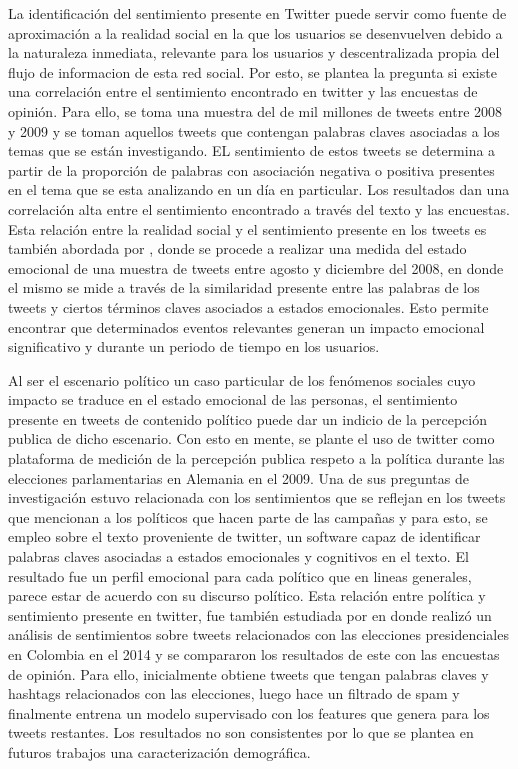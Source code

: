 La identificación del sentimiento presente en Twitter puede servir como fuente de aproximación a la realidad social en la que los usuarios se desenvuelven debido a la naturaleza inmediata, relevante para los usuarios y descentralizada propia del flujo de informacion de esta red social. Por esto,
 \cite{o2010tweets} se plantea la pregunta si existe una correlación entre el sentimiento encontrado en twitter y las encuestas de opinión. Para ello, se toma una muestra del de mil millones de tweets entre 2008 y 2009 y se toman aquellos tweets que contengan palabras claves asociadas a los temas que se están investigando. EL sentimiento de estos tweets se determina a partir de la proporción de palabras con asociación negativa o positiva presentes en el tema que se esta analizando en un día en particular. Los resultados dan una correlación alta entre el sentimiento encontrado a través del texto y las encuestas. Esta relación entre la realidad social y el sentimiento presente en los tweets es también abordada por \cite{bollen2011modeling}, donde se procede a realizar una medida del estado emocional de una muestra de tweets entre agosto y diciembre del 2008, en donde el mismo se mide a través de la similaridad presente entre las palabras de los tweets y ciertos términos claves asociados a estados emocionales. Esto permite encontrar que determinados eventos relevantes generan un impacto emocional significativo y durante un periodo de tiempo en los usuarios.

Al ser el escenario político un caso particular de los fenómenos sociales cuyo impacto se traduce en el estado emocional de las personas, el sentimiento presente en tweets de contenido político puede dar un indicio de la percepción publica de dicho escenario. Con esto en mente, \cite{tumasjan2010predicting} se plante el uso de twitter como plataforma de medición de la percepción publica respeto a la política durante las elecciones parlamentarias en Alemania en el 2009. Una de sus preguntas de investigación estuvo relacionada con los sentimientos que se reflejan en los tweets que mencionan a los políticos que hacen parte de las campañas y para esto, se empleo sobre el texto proveniente de twitter, un software capaz de identificar palabras claves asociadas a estados emocionales y cognitivos en el texto. El resultado fue un perfil emocional para cada político que en lineas generales, parece estar de acuerdo con su discurso político. Esta relación entre política y sentimiento presente en twitter, fue también  estudiada por  \cite{ceron2016sentiment} en donde realizó un análisis de sentimientos sobre tweets relacionados con las elecciones presidenciales en Colombia en el 2014 y se compararon los resultados de este con las encuestas de opinión. Para ello, inicialmente obtiene tweets que tengan  palabras claves y hashtags relacionados con las elecciones, luego hace un filtrado de spam y finalmente entrena un modelo supervisado con los features que genera para los tweets restantes. Los resultados no son consistentes por lo que se plantea en futuros trabajos  una caracterización demográfica.

